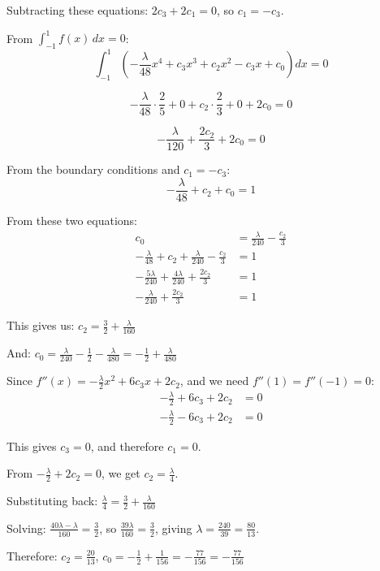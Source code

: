 \documentclass[12pt,a4paper]{article}
\theoremstyle{definition}
\begin{document}
        Subtracting these equations: $2c_3 + 2c_1 = 0$, so $c_1 = -c_3$.

        From $\int_{-1}^{1} f(x) \, dx = 0$:
        $$\int_{-1}^{1} \left(-\frac{\lambda}{48}x^4 + c_3 x^3 + c_2 x^2 - c_3 x + c_0\right) dx = 0$$

        $$-\frac{\lambda}{48} \cdot \frac{2}{5} + 0 + c_2 \cdot \frac{2}{3} + 0 + 2c_0 = 0$$

        $$-\frac{\lambda}{120} + \frac{2c_2}{3} + 2c_0 = 0$$

        From the boundary conditions and $c_1 = -c_3$:
        $$-\frac{\lambda}{48} + c_2 + c_0 = 1$$

        From these two equations:
        \begin{align}
            c_0 &= \frac{\lambda}{240} - \frac{c_2}{3}\\
            -\frac{\lambda}{48} + c_2 + \frac{\lambda}{240} - \frac{c_2}{3} &= 1\\
            -\frac{5\lambda}{240} + \frac{4\lambda}{240} + \frac{2c_2}{3} &= 1\\
            -\frac{\lambda}{240} + \frac{2c_2}{3} &= 1
        \end{align}

        This gives us: $c_2 = \frac{3}{2} + \frac{\lambda}{160}$

        And: $c_0 = \frac{\lambda}{240} - \frac{1}{2} - \frac{\lambda}{480} = -\frac{1}{2} + \frac{\lambda}{480}$

        Since $f''(x) = -\frac{\lambda}{2}x^2 + 6c_3 x + 2c_2$, and we need $f''(1) = f''(-1) = 0$:
        \begin{align}
            -\frac{\lambda}{2} + 6c_3 + 2c_2 &= 0\\
            -\frac{\lambda}{2} - 6c_3 + 2c_2 &= 0
        \end{align}

        This gives $c_3 = 0$, and therefore $c_1 = 0$.

        From $-\frac{\lambda}{2} + 2c_2 = 0$, we get $c_2 = \frac{\lambda}{4}$.

        Substituting back: $\frac{\lambda}{4} = \frac{3}{2} + \frac{\lambda}{160}$

        Solving: $\frac{40\lambda - \lambda}{160} = \frac{3}{2}$, so $\frac{39\lambda}{160} = \frac{3}{2}$, giving $\lambda = \frac{240}{39} = \frac{80}{13}$.

        Therefore: $c_2 = \frac{20}{13}$, $c_0 = -\frac{1}{2} + \frac{1}{156} = -\frac{77}{156} = -\frac{77}{156}$
\end{document}
